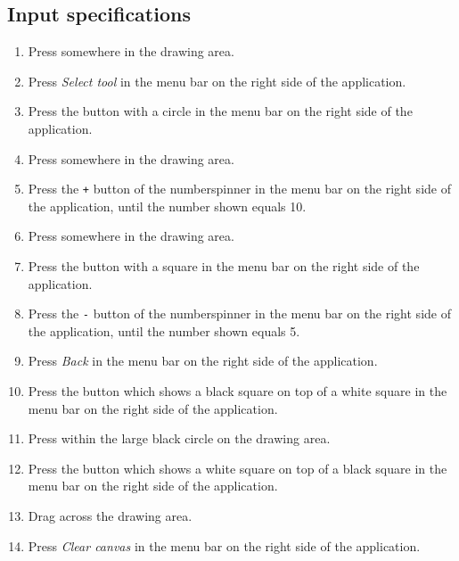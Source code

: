 \subsection*{Input specifications}
\begin{enumerate}
\item Press somewhere in the drawing area.
\item Press \emph{Select tool} in the menu bar on the right side of the application.
\item Press the button with a circle in the menu bar on the right side of the application.
\item Press somewhere in the drawing area.
\item Press the \texttt{+} button of the numberspinner in the menu bar on the right side of the application, until the number shown equals 10.

\item Press somewhere in the drawing area.
\item Press the button with a square in the menu bar on the right side of the application.
\item Press the \texttt{-} button of the numberspinner in the menu bar on the right side of the application, until the number shown equals 5.
\item Press \emph{Back} in the menu bar on the right side of the application.
\item Press the button which shows a black square on top of a white square in the menu bar on the right side of the application. 

\item Press within the large black circle on the drawing area.
\item Press the button which shows a white square on top of a black square in the menu bar on the right side of the application. 
\item Drag across the drawing area.
\item Press \emph{Clear canvas} in the menu bar on the right side of the application. 
\end{enumerate}

